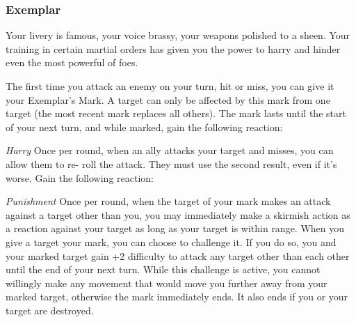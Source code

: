 \subsubsection{Exemplar}

\begin{talent}
{Your livery is famous, your voice brassy, your weapons polished to a sheen. Your training in certain martial orders has given you the power to harry and hinder even the most powerful of foes.}

The first time you attack an enemy on your turn, hit or miss, you can give it your Exemplar's Mark. A target can only be affected by this mark from one target (the most recent mark replaces all others). 
The mark lasts until the start of your next turn, and while marked, gain the
following reaction:

\textit{Harry}\newline 
\Reaction\newline 
Once per round, when an ally attacks your target and misses, you can allow them to re- roll the attack. They must use the second result, even if it's worse.
Gain the following reaction:

\textit{Punishment}\newline
\Reaction\newline 
Once per round, when the target of your mark makes an attack against a target other than you, you may immediately make a skirmish action as a reaction against your target as long as your target is within range.
When you give a target your mark, you can choose to challenge it. If you do so, you and your marked target gain +2 difficulty to attack any target other than each other until the end of your next turn. While this challenge is active, you cannot willingly make any movement that would move you further away from your marked target, otherwise the mark immediately ends. It also ends if you or your target are destroyed.
\end{talent}